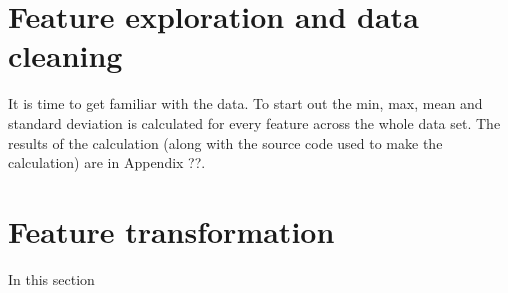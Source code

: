 \section{Feature exploration and data cleaning} %
\label{sec:data_cleaning_and_feature_exploration}

It is time to get familiar with the data. To start out the min, max, mean and standard deviation is calculated for every feature across the whole data set. The results of the calculation (along with the source code used to make the calculation) are in Appendix ??. 



\section{Feature transformation} %
\label{sec:feature_transformation}

In this section

